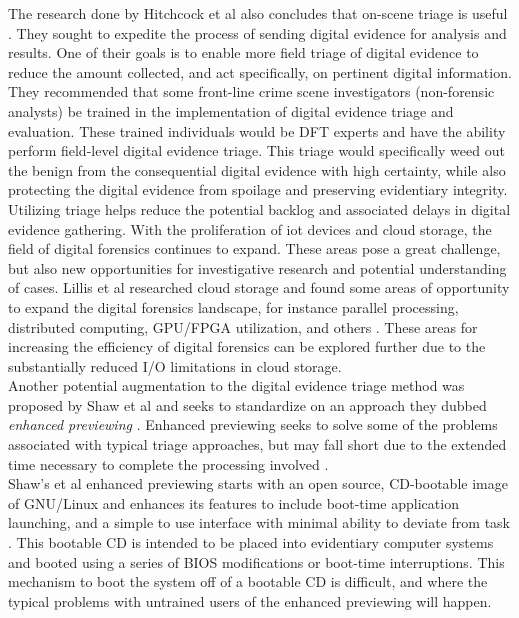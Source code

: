 \documentclass[12pt]{article}
\begin{document}
The research done by Hitchcock et al also concludes that on-scene triage is
useful \cite{hitchcock2016tiered}.  They sought to expedite the process of
sending digital evidence for analysis and results.  One of their goals is to enable
more field triage of digital evidence to reduce the amount collected, and act
specifically, on pertinent digital information.  They recommended that some
front-line crime scene investigators (non-forensic analysts) be trained in the
implementation of digital evidence triage and evaluation.  These trained individuals
would be DFT experts and have the ability perform field-level
digital evidence triage.  This triage would specifically weed out the benign from
the consequential digital evidence with high certainty, while also protecting the
digital evidence from spoilage and preserving evidentiary integrity.\\

Utilizing triage helps
reduce the potential backlog and associated delays in digital evidence gathering.
With the proliferation of \gls{iot} devices and cloud storage, the
field of digital forensics continues to expand.  These areas pose a great challenge,
but also new opportunities for investigative research and potential understanding
of cases.  Lillis et al researched cloud storage and found some areas of opportunity
to expand the digital forensics landscape, for instance parallel processing,
distributed computing, GPU/FPGA utilization, and others \cite{lillis2016current}.
These areas for increasing the efficiency of digital forensics can be explored
further due to the substantially reduced I/O limitations in cloud storage.\\

Another potential augmentation to the digital evidence triage method was proposed by
Shaw et al and seeks to standardize on an approach they dubbed {\em enhanced
previewing} \cite{shaw2013practical}.  Enhanced previewing seeks to solve some of the problems
associated with typical triage approaches, but may fall short due to the extended time
necessary to complete the processing involved \cite{jusas2017methods}.\\

Shaw's et al enhanced previewing starts with an open source, CD-bootable image of
GNU/Linux and enhances its features to include boot-time application launching, and
a simple to use interface with minimal ability to deviate from task \cite{shaw2013practical}.
This bootable CD is intended to be placed into evidentiary computer
systems and booted using a series of BIOS modifications or boot-time interruptions.
This mechanism to boot the system off of a bootable CD is difficult, and where the
typical problems with untrained users of the enhanced previewing will happen.\\
\end{document}
